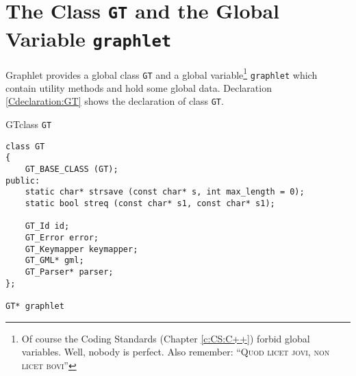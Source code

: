 \documentclass[twoside,fleqn]{report}
\begin{document}
%
%

\section{The Class \texttt{GT} and the Global Variable \texttt{graphlet}}

Graphlet provides a global class \texttt{GT} and a global
variable\footnote{Of course the Coding Standards (Chapter
  \ref{c:CS:C++}) forbid global variables. Well, nobody is
  perfect. Also remember: ``\textsc{Quod licet jovi, non licet
    bovi}''} \texttt{graphlet} which contain utility methods and
hold some global data.  Declaration \ref{Cdeclaration:GT} shows
the declaration of class \texttt{GT}.

\begin{Cdeclaration}{GT}{class \texttt{GT}}
\begin{verbatim}
class GT
{
    GT_BASE_CLASS (GT);
public:
    static char* strsave (const char* s, int max_length = 0);
    static bool streq (const char* s1, const char* s1);

    GT_Id id;
    GT_Error error;
    GT_Keymapper keymapper;
    GT_GML* gml;
    GT_Parser* parser;
};

GT* graphlet
\end{verbatim}
\end{Cdeclaration}
\end{document}
